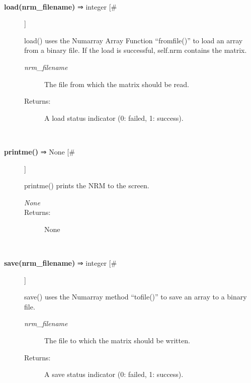 \begin{description}
\begin{description}
\end{description}
\\ 

\item[\textbf{load(nrm\_filename)}
 ⇒ integer [\#]]

 load() uses the Numarray Array Function ``fromfile()'' to load an array from a binary file. If the load is successful, self.nrm contains the matrix.
\begin{description}
\item[\emph{nrm\_filename}
] The file from which the matrix should be read.
\item[Returns:] A load status indicator (0: failed, 1: success).

\end{description}
\\ 

\item[\textbf{printme()}
 ⇒ None [\#]]

 printme() prints the NRM to the screen.
\begin{description}
\item[\emph{None}
]
\item[Returns:] None

\end{description}
\\ 

\item[\textbf{save(nrm\_filename)}
 ⇒ integer [\#]]

 save() uses the Numarray method ``tofile()'' to save an array to a binary file.
\begin{description}
\item[\emph{nrm\_filename}
] The file to which the matrix should be written.
\item[Returns:] A save status indicator (0: failed, 1: success).

\end{description}
\\ 


\end{description}
